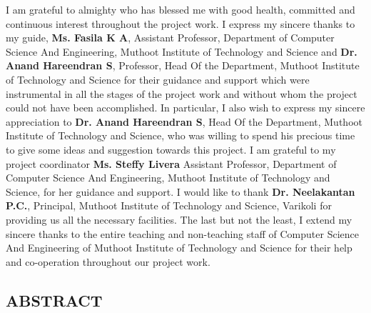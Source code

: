 \documentclass[a4paper,12pt,oneside]{report}  %
\begin{document}
\noindent
\newline
I am grateful to almighty who has blessed me with good health, committed and continuous interest throughout the project work.
\newline
\newline
I express my sincere thanks to my guide, \textbf{Ms. Fasila K A}, Assistant Professor, Department of Computer Science And Engineering, Muthoot Institute of Technology and Science and \textbf{Dr. Anand Hareendran S}, Professor, Head Of the Department, Muthoot Institute of Technology and Science for their guidance and support which were instrumental in all the stages of the project work and without whom the project could not have been accomplished.
\newline
\newline
In particular, I also wish to express my sincere appreciation to \textbf{Dr. Anand Hareendran S}, Head Of the Department, Muthoot Institute of Technology and Science, who was willing to spend his precious time to give some ideas and suggestion towards this project.
\newline
\newline
I am grateful to my project coordinator \textbf{Ms. Steffy Livera } Assistant Professor, Department of Computer Science And Engineering, Muthoot Institute of Technology and Science, for her guidance and support.
\newline
\newline
I would like to thank \textbf{Dr. Neelakantan P.C.}, Principal, Muthoot Institute of Technology and Science, Varikoli for providing us all the necessary facilities.
\newline
\newline
The last but not the least, I extend my sincere thanks to the entire teaching and non-teaching staff of Computer Science And Engineering of Muthoot Institute of Technology and Science for their help and co-operation throughout our project work.

\begin{flushright}
\vspace{10 mm}

\end{flushright}


\newpage
{}
\setcounter{page}{2}
\thispagestyle{plain}
\begin{center}
\section*{ABSTRACT}
\end{center}
\newline
\end{document}
